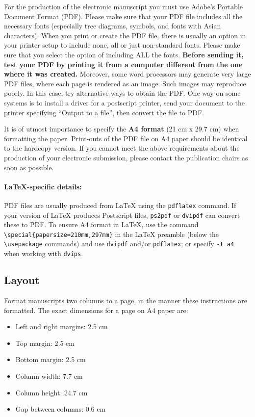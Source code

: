 \documentclass[11pt,a4paper]{article}
\begin{document}
	For the production of the electronic manuscript you must use Adobe's Portable Document Format (PDF).
	Please make sure that your PDF file includes all the necessary fonts (especially tree diagrams, symbols, and fonts with Asian characters).
	When you print or create the PDF file, there is usually an option in your printer setup to include none, all or just non-standard fonts.
	Please make sure that you select the option of including ALL the fonts.
	\textbf{Before sending it, test your PDF by printing it from a computer different from the one where it was created.}
	Moreover, some word processors may generate very large PDF files, where each page is rendered as an image.
	Such images may reproduce poorly.
	In this case, try alternative ways to obtain the PDF.
	One way on some systems is to install a driver for a postscript printer, send your document to the printer specifying ``Output to a file'', then convert the file to PDF.
	
	It is of utmost importance to specify the \textbf{A4 format} (21 cm x 29.7 cm) when formatting the paper.
	Print-outs of the PDF file on A4 paper should be identical to the hardcopy version.
	If you cannot meet the above requirements about the production of your electronic submission, please contact the publication chairs as soon as possible.
	
	\paragraph{\LaTeX-specific details:}
	PDF files are usually produced from \LaTeX{} using the \texttt{\small pdflatex} command.
	If your version of \LaTeX{} produces Postscript files, \texttt{\small ps2pdf} or \texttt{\small dvipdf} can convert these to PDF.
	To ensure A4 format in \LaTeX, use the command {\small\verb|\special{papersize=210mm,297mm}|}
	in the \LaTeX{} preamble (below the {\small\verb|\usepackage|} commands) and use \texttt{\small dvipdf} and/or \texttt{\small pdflatex}; or specify \texttt{\small -t a4} when working with \texttt{\small dvips}.
	
	\subsection{Layout}
	\label{ssec:layout}
	
	Format manuscripts two columns to a page, in the manner these
	instructions are formatted.
	The exact dimensions for a page on A4 paper are:
	
	\begin{itemize}
		\item Left and right margins: 2.5 cm
		\item Top margin: 2.5 cm
		\item Bottom margin: 2.5 cm
		\item Column width: 7.7 cm
		\item Column height: 24.7 cm
		\item Gap between columns: 0.6 cm
	\end{itemize}
	
\end{document}
